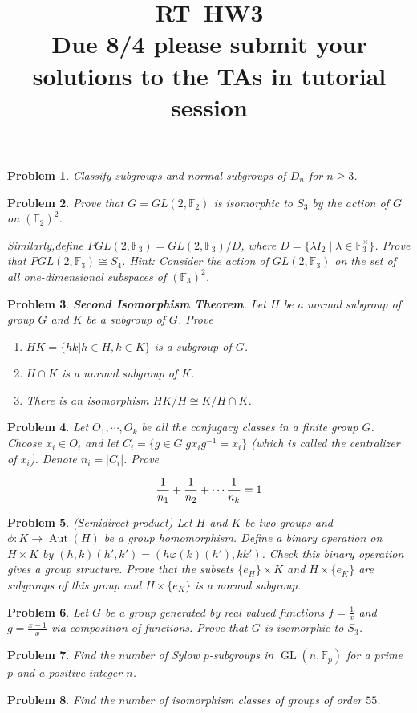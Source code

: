 \documentclass{article}
\title{RT\ HW3 \\ Due 8/4 please submit your solutions to the TAs in tutorial session}
\newtheorem{ex}{Problem}
\newcommand{\F}{\mathbb{F}}
\newcommand{\GL}{\operatorname{GL}}
\newcommand{\Aut}{\operatorname{Aut}}
\begin{document}
\maketitle      

\begin{ex}
Classify subgroups and normal subgroups of $D_n$ for $n\geq 3$.
\end{ex}

\begin{ex}
Prove that $G=GL(2, \F_2)$ is isomorphic to $S_3$ by the action of $G$ on $(\F_2)^2$.

Similarly,define $PGL(2, \F_3)=GL(2, \F_3)/D$, where $D=\{\lambda I_2\mid \lambda\in \F_3^{\times}\}$. Prove that $PGL(2, \F_3)\cong S_4$. Hint: Consider the action of $GL(2, \F_3)$ on the set of all one-dimensional subspaces of $(\F_3)^2$.
\end{ex}

\begin{ex}

\textbf{Second Isomorphism Theorem}. Let $H$ be a normal subgroup of group $G$ and $K$ be a subgroup of $G$. Prove 
\begin{enumerate}
\item $HK=\{hk|h\in H, k\in K\}$ is a subgroup of $G$.
\item $H\cap K$ is a normal subgroup of $K$.
\item There is an isomorphism $HK/H\cong K/H\cap K$.
\end{enumerate}
\end{ex}
\begin{ex}
Let $O_1, \cdots, O_k$ be all the conjugacy classes in a finite group $G$. Choose $x_i\in O_i$ and let $C_i=\{g\in G|gx_ig^{-1}=x_i\}$ (which is called the centralizer of $x_i$). Denote $n_i=|C_i|$. Prove 

$$
{1\over n_1}+{1\over n_2}+\cdots {1\over n_k}=1
$$

\end{ex}

\begin{ex}
(Semidirect product) Let $H$ and $K$ be two groups and $\phi\colon K\to \Aut(H)$ be a group homomorphism. Define a binary operation on $H\times K$ by $(h,k)(h', k')=(h\varphi(k)(h'), kk')$. Check this binary operation gives a group structure. Prove that the subsets $\{e_H\}\times K$ and $H\times \{e_K\}$ are subgroups of this group and $H\times \{e_K\}$ is a normal subgroup. 
\end{ex}




\begin{ex}
Let $G$ be a group generated by real valued functions $f=\frac{1}{x}$ and $g=\frac{x-1}{x}$ via composition of functions. Prove that $G$ is isomorphic to $S_{3}$.
\end{ex}

\begin{ex}  
Find the number of Sylow $p$-subgroups in $\GL(n, \F_p)$ for a prime $p$ and a positive integer $n$.
\end{ex}

\begin{ex}
    Find the number of isomorphism classes of groups of order $55$.

\end{ex}
\end{document}
